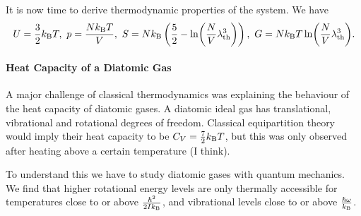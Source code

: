 It is now time to derive thermodynamic properties of the system. We have
\begin{align*}
	U = \frac{3}{2}\kb T,\ p = \frac{N\kb T}{V},\ S = N\kb\left(\frac{5}{2} - \ln(\frac{N}{V}\lambda_{\text{th}}^{3})\right),\ G = N\kb T\ln(\frac{N}{V}\lambda_{\text{th}}^{3}).
\end{align*}

\paragraph{Heat Capacity of a Diatomic Gas}
A major challenge of classical thermodynamics was explaining the behaviour of the heat capacity of diatomic gases. A diatomic ideal gas has translational, vibrational and rotational degrees of freedom. Classical equipartition theory would imply their heat capacity to be $C_{V} = \frac{7}{2}k_{\text{B}} T$, but this was only observed after heating above a certain temperature (I think).

To understand this we have to study diatomic gases with quantum mechanics. We find that higher rotational energy levels are only thermally accessible for temperatures close to or above $\frac{\hbar^{2}}{2Ik_{\text{B}}}$, and vibrational levels close to or above $\frac{\hbar\omega}{k_{\text{B}}}$.